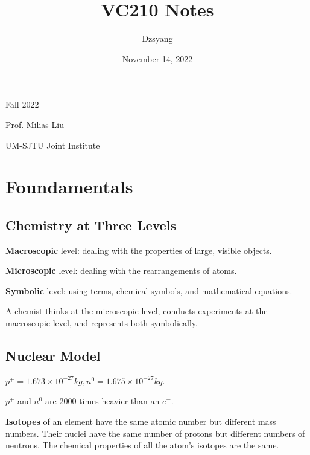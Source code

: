 \documentclass[a4paper,12pt]{article}
\begin{document}
\title{\huge VC210 Notes} 
\author{Dzsyang}
\date{November 14, 2022}

\maketitle %
\thispagestyle{fancy}

\begin{center}

\large Fall 2022\par
\large Prof. Milias Liu\par
\large UM-SJTU Joint Institute
\end{center}

\newpage

\tableofcontents

\newpage



\newpage
\section{Foundamentals}
\subsection{Chemistry at Three Levels}
\textbf{Macroscopic} level: dealing with the properties of large, visible objects.\par
\textbf{Microscopic} level: dealing with the rearrangements of atoms.\par
\textbf{Symbolic} level: using terms, chemical symbols, and mathematical equations.\par
A chemist thinks at the microscopic level, conducts experiments at the macroscopic level, and represents both symbolically.
\subsection{Nuclear Model}
$p^{+} = 1.673\times10^{-27} kg, n^{0} = 1.675\times10^{-27} kg$.\par $p^{+}$ and $n^{0}$ are 2000 times heavier than an $e^{-}$.\par
\textbf{Isotopes} of an element have the same atomic number but different mass numbers. Their nuclei have the same number of protons but different numbers of neutrons. The chemical properties of all the atom’s isotopes are the same.
\end{document}
